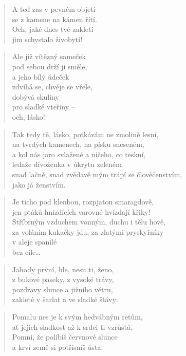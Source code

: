 \documentclass{book}
\begin{document}
\begin{verse}
A teď zas v pevném objetí\\
se z kamene na kámen řítí.\\
Och, jaké dnes tvé zakletí\\
jim schystalo živobytí!
\end{verse}
\begin{verse}
Ale již vítězný sameček\\
pod sebou drží ji směle,\\
a jeho bílý údeček\\
zdvíhá se, chvěje se vřele,\\
dobývá skuliny\\
pro sladké vteřiny --\\
och, lásko!
\end{verse}
\begin{verse}
Tak tedy tě, lásko, potkávám ne zmolině lesní,\\
na tvrdých kamenech, na písku sneseném,\\
a kol nás jaro svlažené a ničeho, co teskní,\\
ledaže divoženka v úkrytu zeleném\\
snad lačně, snad zvědavě mým trápí se člověčenstvím,\\
jako já ženstvím.
\end{verse}
\begin{verse}
Je ticho pod klenbou, rozpjatou smaragdově,\\
jen ptáků hnízdících varovné hvízdají křiky!\\
Stříbrným vzduchem vonným, duchu i tělu hově,\\
za voláním kukačky jdu, za zlatými pryskyřníky\\
v aleje spanilé\\
bez cíle\ldots
\end{verse}
\newpage
{}
\begin{verse}
Jahody první, hle, nesu ti, ženo,\\
z bukové paseky, z vysoké trávy,\\
pozdravy slunce a jižního větru,\\
zakleté v šarlat a ve sladké šťávy:
\end{verse}
\begin{verse}
Pomalu nes je k svým hedvábným retům,\\
ať jejich sladkost až k srdci ti vzrůstá.\\
Pomni, že políbíš červnové slunce\\
a krví země si potřísníš ústa.
\end{verse}
\end{document}

